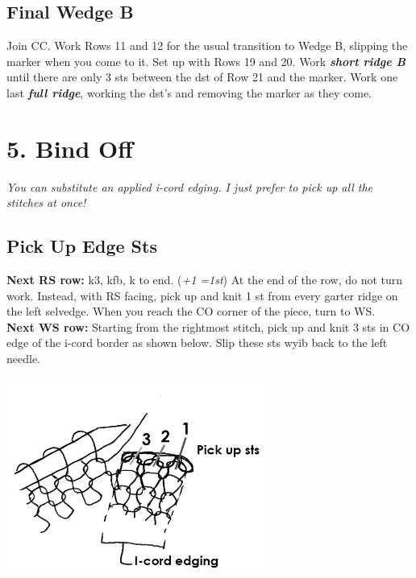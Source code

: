\documentclass[12pt]{article}
\newcommand{\vocab}[1]{\emph{\textbf{#1}}} %
\newcommand{\rowDir}[1]{\textbf{#1:}} %
\newcommand{\increase}[1]{(\emph{+#1 
	\ifnum#1=1{st}\else{sts}\fi})}
\begin{document}
\begin{multicols}{2}
\subsection*{Final Wedge B}

Join CC. Work Rows 11 and 12 for the usual transition to Wedge B, slipping the marker when you come to it. Set up with Rows 19 and 20. Work \vocab{short ridge B} until there are only 3 sts between the dst of Row 21 and the marker. Work one last \vocab{full ridge}, working the dst's and removing the marker as they come.

\columnbreak

\section*{5. Bind Off}

\emph{You can substitute an applied i-cord edging. I just prefer to pick up all the stitches at once!} \vspace{-1em}

\subsection*{Pick Up Edge Sts}
\rowDir{Next RS row} k3, kfb, k to end. \increase{1} At the end of the row, do not turn work. Instead, with RS facing, pick up and knit 1 st from every garter ridge on the left selvedge. When you reach the CO corner of the piece, turn to WS. \\
\rowDir{Next WS row} Starting from the rightmost stitch, pick up and knit 3 sts in CO edge of the i-cord border as shown below. Slip these sts wyib back to the left needle.

\begin{center}
\vspace{-2em}
\includegraphics[height=2.5in]{pics_BW/pickup.png}
\end{center}


\end{multicols}
\end{document}

